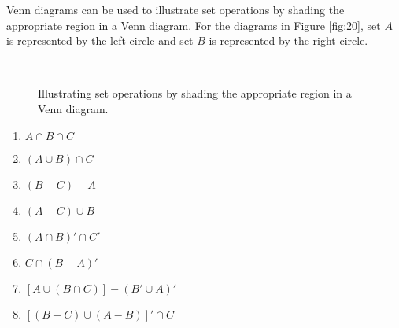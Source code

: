Venn diagrams can be used to illustrate set operations by shading the appropriate region in a Venn diagram. For the diagrams in Figure \eqref{fig:20}, set $A$ is represented by the left circle and set $B$ is represented by the right circle.

\begin{figure}[h]
\centering
	\qquad
	\\
	\qquad
		\caption{Illustrating set operations by shading the appropriate region in a Venn diagram.}
		\label{fig:20}
\end{figure}

\begin{multicols}{2}
\begin{enumerate}
\item $A\cap B\cap C$
\item $(A\cup B)\cap C$
\item $(B-C)-A$
\item $(A-C)\cup B$
\item $(A\cap B)'\cap C'$
\item $C\cap (B-A)'$
\item $[A\cup (B\cap C)]-(B'\cup A)'$
\item $[(B-C)\cup (A-B)]'\cap C$
\end{enumerate}
\end{multicols}

